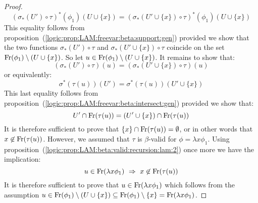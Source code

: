 \begin{proof}
        \[
            (\sigma_{*}(U')\circ\tau)^{*}(\phi_{1})(U\cup\{x\})
            =
            (\sigma_{*}(U'\cup\{x\})\circ\tau)^{*}(\phi_{1})(U\cup\{x\})
        \]
    This equality follows from 
    proposition~(\ref{logic:prop:LAM:freevar:beta:support:gen}) provided
    we show that the two functions $\sigma_{*}(U')\circ\tau$ and
    $\sigma_{*}(U'\cup\{x\})\circ\tau$ coincide on the set $\mbox{\rm Fr}(\phi_{1})
    \setminus(U\cup\{x\})$. So let $u\in\mbox{\rm Fr}(\phi_{1})\setminus(U\cup\{x\})$.
    It remains to show that:
        \[
            (\sigma_{*}(U')\circ\tau)(u) 
            =
            (\sigma_{*}(U'\cup\{x\})\circ\tau)(u) 
        \]
    or equivalently:
        \[
            \sigma^{*}(\tau(u))(U')
            =
            \sigma^{*}(\tau(u))(U'\cup\{x\})
        \]
    This last equality follows from
    proposition~(\ref{logic:prop:LAM:freevar:beta:intersect:gen}) provided
    we show that:
        \[
            U' \cap\mbox{\rm Fr}(\tau(u)) = (U'\cup\{x\})\cap\mbox{\rm Fr}(\tau(u))
        \]
    It is therefore sufficient to prove that $\{x\}\cap\mbox{\rm Fr}(\tau(u))=\emptyset$,
    or in other words that $x\not\in\mbox{\rm Fr}(\tau(u))$. However, we assumed that 
    $\tau$ is $\beta$-valid for $\phi=\lambda x\phi_{1}$. Using
    proposition~(\ref{logic:prop:LAM:beta:valid:recursion:lam:2}) once more
    we have the implication:
        \[
            u\in\free(\lambda x\phi_{1})\ 
            \Rightarrow\ 
            x\not\in\free(\tau(u))
        \]
    It is therefore sufficient to prove that $u\in\mbox{\rm Fr}(\lambda x\phi_{1})$
    which follows from the assumption $u\in\mbox{\rm Fr}(\phi_{1})\setminus(U\cup\{x\})
    \subseteq\mbox{\rm Fr}(\phi_{1})\setminus\{x\}=\mbox{\rm Fr}(\lambda x\phi_{1})$.
\end{proof}

